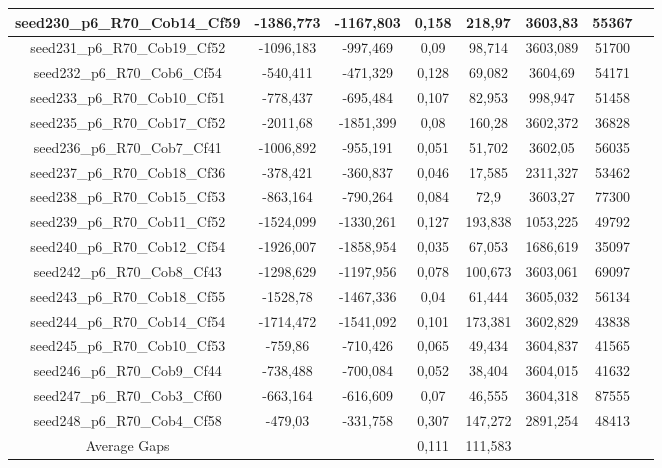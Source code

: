 \documentclass[a4paper]{article}
\begin{document}
\begin{center}
\begin{longtable}{cccccccc}
\hline
seed230\_p6\_R70\_Cob14\_Cf59 & -1386,773 & -1167,803 & 0,158 & 218,97 & 3603,83 & 55367\\
\hline
seed231\_p6\_R70\_Cob19\_Cf52 & -1096,183 & -997,469 & 0,09 & 98,714 & 3603,089 & 51700\\
\hline
seed232\_p6\_R70\_Cob6\_Cf54 & -540,411 & -471,329 & 0,128 & 69,082 & 3604,69 & 54171\\
\hline
seed233\_p6\_R70\_Cob10\_Cf51 & -778,437 & -695,484 & 0,107 & 82,953 & 998,947 & 51458\\
\hline
seed235\_p6\_R70\_Cob17\_Cf52 & -2011,68 & -1851,399 & 0,08 & 160,28 & 3602,372 & 36828\\
\hline
seed236\_p6\_R70\_Cob7\_Cf41 & -1006,892 & -955,191 & 0,051 & 51,702 & 3602,05 & 56035\\
\hline
seed237\_p6\_R70\_Cob18\_Cf36 & -378,421 & -360,837 & 0,046 & 17,585 & 2311,327 & 53462\\
\hline
seed238\_p6\_R70\_Cob15\_Cf53 & -863,164 & -790,264 & 0,084 & 72,9 & 3603,27 & 77300\\
\hline
seed239\_p6\_R70\_Cob11\_Cf52 & -1524,099 & -1330,261 & 0,127 & 193,838 & 1053,225 & 49792\\
\hline
seed240\_p6\_R70\_Cob12\_Cf54 & -1926,007 & -1858,954 & 0,035 & 67,053 & 1686,619 & 35097\\
\hline
seed242\_p6\_R70\_Cob8\_Cf43 & -1298,629 & -1197,956 & 0,078 & 100,673 & 3603,061 & 69097\\
\hline
seed243\_p6\_R70\_Cob18\_Cf55 & -1528,78 & -1467,336 & 0,04 & 61,444 & 3605,032 & 56134\\
\hline
seed244\_p6\_R70\_Cob14\_Cf54 & -1714,472 & -1541,092 & 0,101 & 173,381 & 3602,829 & 43838\\
\hline
seed245\_p6\_R70\_Cob10\_Cf53 & -759,86 & -710,426 & 0,065 & 49,434 & 3604,837 & 41565\\
\hline
seed246\_p6\_R70\_Cob9\_Cf44 & -738,488 & -700,084 & 0,052 & 38,404 & 3604,015 & 41632\\
\hline
seed247\_p6\_R70\_Cob3\_Cf60 & -663,164 & -616,609 & 0,07 & 46,555 & 3604,318 & 87555\\
\hline
seed248\_p6\_R70\_Cob4\_Cf58 & -479,03 & -331,758 & 0,307 & 147,272 & 2891,254 & 48413\\
\hline
\hline
Average Gaps & & & 0,111 & 111,583 & & \\
\hline
\hline
\end{longtable}
\end{center}
\end{document}
